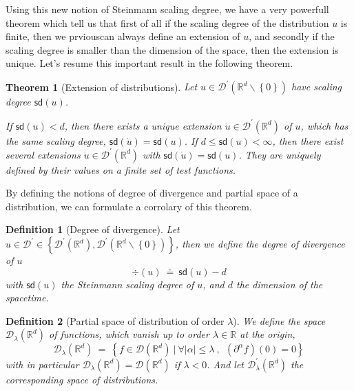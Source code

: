 \documentclass[10pt]{book}
\newcommand{\sd}{\mathsf{sd}}
\newcommand{\abs}[1]{\left|#1\right|}
\newcommand{\Dcal}{\mathcal{D}}
\newcommand{\Rbb}{\mathbb{R}}
\theoremstyle{break}
\newtheorem{theorem}{Theorem}
\newtheorem{definition}{Definition}
\begin{document}
Using this new notion of Steinmann scaling degree, we have a very powerfull theorem  which tell us that first of all if the scaling degree of the distribution $u$ is finite, then we prviouscan always define an extension of $u$, and secondly if the scaling degree is smaller than the dimension of the space, then the extension is unique. Let's resume this important result in the following theorem.

\begin{theorem}[Extension of distributions]
 Let $u \in \Dcal^\prime(\Rbb^d \backslash\left\{ 0\right\} )$ have scaling degree $\sd(u)$.
 
  If $\sd(u)<d$, then there exists a unique extension $\dot{u} \in \Dcal^\prime(\Rbb^d)$ of $u$, which has the same scaling degree, $\sd(\dot{u})=\sd(u)$.
  If $d\leq\sd(u)<\infty$, then there exist several extensions $\dot{u} \in \Dcal^\prime(\mathbb{R}^{d})$ with $\sd(\dot{u})=\sd(u)$. They are uniquely defined by their values on a finite set of test functions.

\end{theorem}

By defining the notions of degree of divergence and  partial space of a distribution, we can formulate a corrolary of this theorem.

\begin{definition}[Degree of divergence]
 Let $u \in \Dcal^\prime \in \left\{ \Dcal^\prime(\mathbb{R}^{d}),\Dcal^\prime(\mathbb{R}^{d}\backslash\left\{ 0\right\} )\right\} $,
 then we define the degree of divergence of $u$
 \begin{equation*}
  \div(u) \ \doteq \ \sd(u)-d 
 \end{equation*}
 with $\sd(u)$ the Steinmann scaling degree of $u$, and $d$ the dimension of the spacetime.  
\end{definition}

\begin{definition}[Partial space of distribution of order $\lambda$]
 We define the space $\Dcal_{\lambda}(\Rbb^d)$ of functions, which vanish up to order $\lambda \in \Rbb$ at the origin, 
 \begin{equation*}
  \Dcal_{\lambda}(\Rbb^d) \ = \ \left\{ f \in \Dcal(\Rbb^d) \ | \ \forall \abs{\alpha} \leq \lambda\ , \ \ \left(\partial^{\alpha}f\right)(0)=0 \right\} 
 \end{equation*}
 with in particular $\Dcal_\lambda(\Rbb^d) = \Dcal(\Rbb^d)$ if $\lambda < 0$. And let $\Dcal^\prime_\lambda(\Rbb^d)$ the corresponding space of distributions. 
\end{definition}
\end{document}
